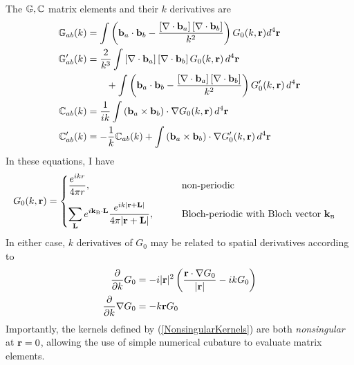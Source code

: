 \documentclass[letterpaper]{article}
\begin{document}
The $\mathbb{G}, \mathbb{C}$ matrix elements and their $k$ derivatives are 
\begin{align*}
\mathbb{G}_{ab}(k)
&=
 \int \left(\mathbf{b}_a \cdot \mathbf{b}_b
            - \frac{ \left[\nabla \cdot \mathbf{b}_a\right]
                     \left[\nabla \cdot \mathbf{b}_b\right]
                   }{k^2}
      \right) G_0(k, \mathbf{r}) d^4 \mathbf{r}
\\
 \mathbb{G}^\prime_{ab}(k)
&= \frac{2}{k^3}
   \int \left[\nabla \cdot \mathbf{b}_a\right] 
        \left[\nabla \cdot \mathbf{b}_b\right] G_0(k,\mathbf{r})
   \, d^4 \mathbf{r}
\\
&\qquad
 +
 \int \left(\mathbf{b}_a \cdot \mathbf{b}_b 
            - \frac{ \left[\nabla \cdot \mathbf{b}_a\right]
                     \left[\nabla \cdot \mathbf{b}_b\right] 
                   }{k^2}
      \right) G_0^\prime(k,\mathbf{r})\, d^4\mathbf{r}
\\
\mathbb{C}_{ab}(k)
&=
 \frac{1}{ik}
 \int \left(\mathbf{b}_a \times \mathbf{b}_b \right) \cdot \nabla G_0(k,\mathbf{r})
 \,d^4 \mathbf{r}
\\
\mathbb{C}^\prime_{ab}(k)
&= -\frac{1}{k}\mathbb{C}_{ab}(k)
   +
   \int \left(\mathbf{b}_a \times \mathbf{b}_b \right) \cdot \nabla G_0^\prime(k,\mathbf{r})
 \,d^4 \mathbf{r}
\end{align*}
In these equations, I have 
\begin{align*}
 G_0(k,\mathbf{r}) &= 
  \begin{cases} 
    \displaystyle{ \frac{e^{ikr}}{4\pi r} }, \qquad &\text{non-periodic} 
       \\[10pt]
    \displaystyle{ \sum_{\mathbf{L}} e^{i\mathbf{k}_{\hbox{\tiny{B}}}\cdot \mathbf{L}}
                   \frac{e^{ik|\mathbf{r}+\mathbf{L}|}}{4\pi |\mathbf{r}+\mathbf{L}|}
                 }, \qquad &\text{Bloch-periodic with Bloch vector $\mathbf{k}_{\hbox{\tiny{B}}}$} \\
  \end{cases} 
\end{align*}
In either case, $k$ derivatives of $G_0$ may be related to 
spatial derivatives according to
\begin{align}
 \frac{\partial }{\partial k} G_0
 &= -i|\mathbf{r}|^2 \left( \frac{\mathbf{r} \cdot \nabla G_0}{|\mathbf{r}|} - ik G_0\right)
\\
 \frac{\partial }{\partial k} \nabla G_0 
&= -k \mathbf{r} G_0
\label{NonsingularKernels}
\end{align}
Importantly, the kernels defined by (\ref{NonsingularKernels}) are
both \textit{nonsingular} at $\mathbf{r}=0$, allowing the use of simple
numerical cubature to evaluate matrix elements.
\end{document}
